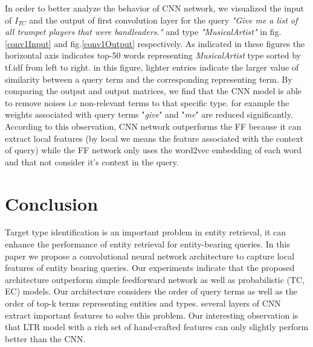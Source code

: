 In order to better analyze the behavior of CNN network, we visualized the input of $I_{TC}$ and the output of first convolution layer for the query \textit{"Give me a list of all trumpet players that were bandleaders."} and type \textit{"MusicalArtist"} in fig.\ref{conv1Input} and fig.\ref{conv1Output} respectively. As indicated in these figures the horizontal axis indicates top-50 words representing \textit{MusicalArtist} type sorted by tf.idf from left to right. in this figure, lighter entries indicate the larger value of similarity between a query term and the corresponding representing term. By comparing the output and output matrices, we find that the CNN model is able to remove noises i.e non-relevant terms to that specific type. for example the weights associated with query terms "\textit{give}" and "\textit{me}" are reduced significantly. According to this observation, CNN network outperforms the FF because it can extract local features (by local we means the feature associated with the context of query) while the FF network only uses the word2vec embedding of each word and that not consider it's context in the query.     
\section{Conclusion}
Target type identification is an important problem in entity retrieval, it can enhance the performance of entity retrieval for entity-bearing queries. In this paper we propose a convolutional neural network architecture to capture local features of entity bearing queries. Our experiments indicate that the proposed architecture outperform simple feedforward network as well as probabilistic (TC, EC) models. Our architecture considers the order of query terms as well as the order of top-k terms representing entities and types. several layers of CNN extract important features to solve this problem. Our interesting observation is that LTR model with a rich set of hand-crafted features can only slightly perform better than the CNN.

